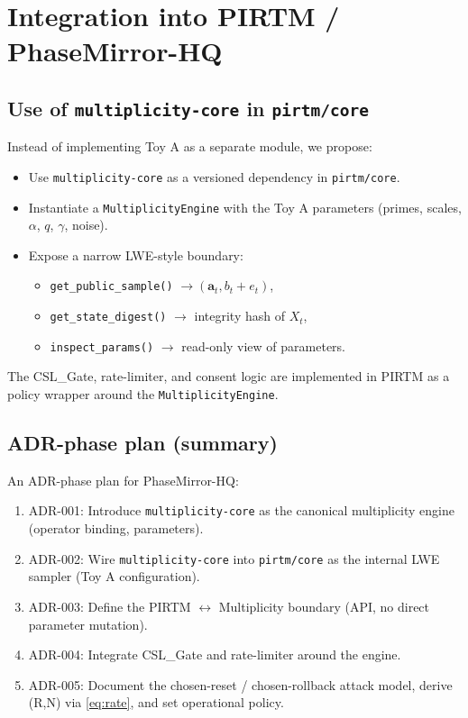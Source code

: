 \documentclass[11pt]{article}
\begin{document}
\section{Integration into PIRTM / PhaseMirror-HQ}

\subsection{Use of \texttt{multiplicity-core} in \texttt{pirtm/core}}

Instead of implementing Toy A as a separate module, we propose:

\begin{itemize}
    \item Use \texttt{multiplicity-core} as a versioned dependency in
    \texttt{pirtm/core}.
    \item Instantiate a \texttt{MultiplicityEngine} with the Toy A parameters
    (primes, scales, $\alpha$, $q$, $\gamma$, noise).
    \item Expose a narrow LWE-style boundary:
    \begin{itemize}
        \item \texttt{get\_public\_sample()} $\to (\mathbf{a}_t, b_t + e_t)$,
        \item \texttt{get\_state\_digest()} $\to$ integrity hash of $X_t$,
        \item \texttt{inspect\_params()} $\to$ read-only view of parameters.
    \end{itemize}
\end{itemize}

The CSL\_Gate, rate-limiter, and consent logic are implemented in PIRTM as a
policy wrapper around the \texttt{MultiplicityEngine}.

\subsection{ADR-phase plan (summary)}

An ADR-phase plan for PhaseMirror-HQ:

\begin{enumerate}
    \item ADR-001: Introduce \texttt{multiplicity-core} as the canonical
    multiplicity engine (operator binding, parameters).
    \item ADR-002: Wire \texttt{multiplicity-core} into \texttt{pirtm/core} as
    the internal LWE sampler (Toy A configuration).
    \item ADR-003: Define the PIRTM $\leftrightarrow$ Multiplicity boundary
    (API, no direct parameter mutation).
    \item ADR-004: Integrate CSL\_Gate and rate-limiter around the engine.
    \item ADR-005: Document the chosen-reset / chosen-rollback attack model,
    derive (R,N) via \eqref{eq:rate}, and set operational policy.
\end{enumerate}
\end{document}
